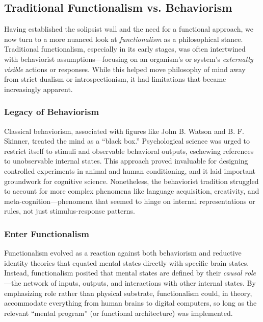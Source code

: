 \documentclass[12pt,letterpaper]{article}
\begin{document}
\subsection{Traditional Functionalism vs. Behaviorism}

Having established the solipsist wall and the need for a functional approach, we now turn to a more nuanced look at \textit{functionalism} as a philosophical stance. Traditional functionalism, especially in its early stages, was often intertwined with behaviorist assumptions---focusing on an organism's or system's \textit{externally visible} actions or responses. While this helped move philosophy of mind away from strict dualism or introspectionism, it had limitations that became increasingly apparent.

\subsubsection{Legacy of Behaviorism}

Classical behaviorism, associated with figures like John B. Watson and B. F. Skinner, treated the mind as a ``black box.'' Psychological science was urged to restrict itself to stimuli and observable behavioral outputs, eschewing references to unobservable internal states. This approach proved invaluable for designing controlled experiments in animal and human conditioning, and it laid important groundwork for cognitive science. Nonetheless, the behaviorist tradition struggled to account for more complex phenomena like language acquisition, creativity, and meta-cognition---phenomena that seemed to hinge on internal representations or rules, not just stimulus-response patterns.

\subsubsection{Enter Functionalism}

Functionalism evolved as a reaction against both behaviorism and reductive identity theories that equated mental states directly with specific brain states. Instead, functionalism posited that mental states are defined by their \textit{causal role}---the network of inputs, outputs, and interactions with other internal states. By emphasizing role rather than physical substrate, functionalism could, in theory, accommodate everything from human brains to digital computers, so long as the relevant ``mental program'' (or functional architecture) was implemented.
\end{document}
